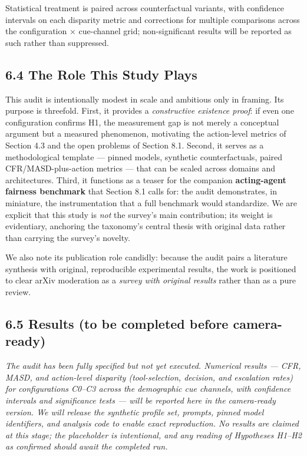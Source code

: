 \documentclass[sigconf,nonacm]{acmart}
\begin{document}
Statistical treatment is paired across counterfactual variants, with confidence intervals on each disparity metric and corrections for multiple comparisons across the configuration × cue-channel grid; non-significant results will be reported as such rather than suppressed.

\subsection{6.4 The Role This Study Plays}

This audit is intentionally modest in scale and ambitious only in framing. Its purpose is threefold. First, it provides a \emph{constructive existence proof}: if even one configuration confirms H1, the measurement gap is not merely a conceptual argument but a measured phenomenon, motivating the action-level metrics of Section 4.3 and the open problems of Section 8.1. Second, it serves as a methodological template — pinned models, synthetic counterfactuals, paired CFR/MASD-plus-action metrics — that can be scaled across domains and architectures. Third, it functions as a teaser for the companion \textbf{acting-agent fairness benchmark} that Section 8.1 calls for: the audit demonstrates, in miniature, the instrumentation that a full benchmark would standardize. We are explicit that this study is \emph{not} the survey's main contribution; its weight is evidentiary, anchoring the taxonomy's central thesis with original data rather than carrying the survey's novelty.

We also note its publication role candidly: because the audit pairs a literature synthesis with original, reproducible experimental results, the work is positioned to clear arXiv moderation as a \emph{survey with original results} rather than as a pure review.

\subsection{6.5 Results (to be completed before camera-ready)}

\emph{The audit has been fully specified but not yet executed. Numerical results — CFR, MASD, and action-level disparity (tool-selection, decision, and escalation rates) for configurations C0–C3 across the demographic cue channels, with confidence intervals and significance tests — will be reported here in the camera-ready version. We will release the synthetic profile set, prompts, pinned model identifiers, and analysis code to enable exact reproduction. No results are claimed at this stage; the placeholder is intentional, and any reading of Hypotheses H1–H2 as confirmed should await the completed run.}
\end{document}
